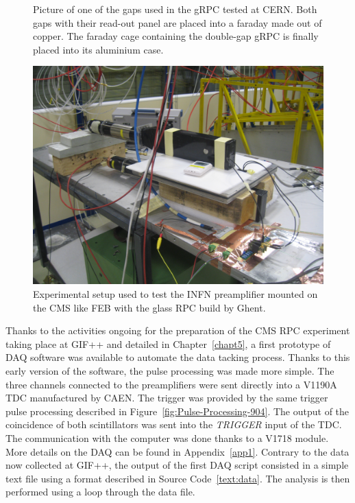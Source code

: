 \begin{figure}[H]
\begin{subfigure}{\linewidth}
			\caption{\label{fig:UGent-gRPC-pictures:C}}
		\end{subfigure}
		\caption{\label{fig:UGent-gRPC-pictures}  Picture of one of the gaps used in the gRPC tested at CERN.  Both gaps with their read-out panel are placed into a faraday made out of copper.  The faraday cage containing the double-gap gRPC is finally placed into its aluminium case.}
    \end{figure}

	\begin{figure}[H]
		\centering
		\includegraphics[width=.6\linewidth]{fig/chapt6/Setup_ATLAS_gRPC.JPG}
		\caption{\label{fig:Setup-INFN-gRPC} Experimental setup used to test the INFN preamplifier mounted on the CMS like FEB with the glass RPC build by Ghent.}
	\end{figure}
    
    Thanks to the activities ongoing for the preparation of the CMS RPC experiment taking place at GIF++ and detailed in Chapter~\ref{chapt5}, a first prototype of DAQ software was available to automate the data tacking process. Thanks to this early version of the software, the pulse processing was made more simple. The three channels connected to the preamplifiers were sent directly into a V1190A TDC manufactured by CAEN. The trigger was provided by the same trigger pulse processing described in Figure~\ref{fig:Pulse-Processing-904}. The output of the coincidence of both scintillators was sent into the \textit{TRIGGER} input of the TDC. The communication with the computer was done thanks to a V1718 module. More details on the DAQ can be found in Appendix~\ref{app1}. Contrary to the data now collected at GIF++, the output of the first DAQ script consisted in a simple text file using a format described in Source Code~\ref{text:data}. The analysis is then performed using a loop through the data file.
    
